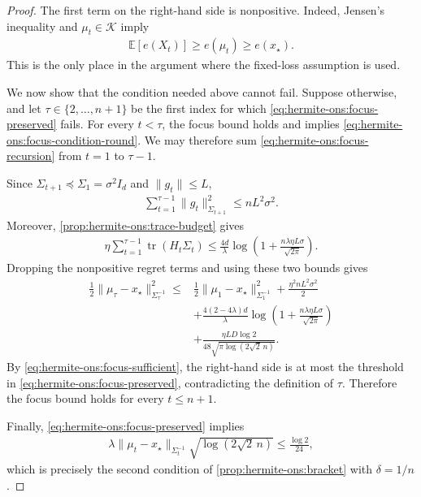 \documentclass{article}
\theoremstyle{plain}
\theoremstyle{definition}
\theoremstyle{plain}
\newcommand{\tr}{\operatorname{tr}}
\newcommand{\E}{\mathbb E}
\newcommand{\cK}{\mathcal K}
\begin{document}
\begin{proof}
    The first term on the right-hand side is nonpositive. Indeed,
    Jensen's inequality and $\mu_t\in\cK$ imply
    \begin{align}
        \E[e(X_t)]
        \geq
        e(\mu_t)
        \geq
        e(x_\star).
        \label{eq:hermite-ons:stationary-nonnegative}
    \end{align}
    This is the only place in the argument where the fixed-loss
    assumption is used.

    We now show that the condition needed above cannot fail. Suppose
    otherwise, and let $\tau\in\{2,\ldots,n+1\}$ be the first index
    for which \eqref{eq:hermite-ons:focus-preserved} fails. For every
    $t<\tau$, the focus bound holds and implies
    \eqref{eq:hermite-ons:focus-condition-round}. We may therefore
    sum \eqref{eq:hermite-ons:focus-recursion} from $t=1$ to
    $\tau-1$.

    Since $\Sigma_{t+1}\preceq\Sigma_1=\sigma^2I_d$ and
    $\|g_t\|\leq L$,
    \begin{align}
        \sum_{t=1}^{\tau-1}
        \|g_t\|_{\Sigma_{t+1}}^2
        \leq nL^2\sigma^2.
        \label{eq:hermite-ons:focus-gradient-budget}
    \end{align}
    Moreover, \cref{prop:hermite-ons:trace-budget} gives
    \begin{align}
        \eta\sum_{t=1}^{\tau-1}\tr(H_t\Sigma_t)
        \leq
        \frac{4d}{\lambda}
        \log\left(
        1+\frac{n\lambda\eta L\sigma}{\sqrt{2\pi}}
        \right).
        \label{eq:hermite-ons:focus-trace-budget}
    \end{align}
    Dropping the nonpositive regret terms and using these two bounds
    gives
    \begin{align}
        \frac12
        \|\mu_\tau-x_\star\|_{\Sigma_\tau^{-1}}^2
        \leq{} &
        \frac12
        \|\mu_1-x_\star\|_{\Sigma_1^{-1}}^2
        +
        \frac{\eta^2nL^2\sigma^2}{2}
        \nonumber  \\
               & +
        \frac{4(2-4\lambda)d}{\lambda}
        \log\left(
        1+\frac{n\lambda\eta L\sigma}{\sqrt{2\pi}}
        \right)
        \nonumber  \\
               & +
        \frac{\eta LD\log2}
        {48\sqrt{\pi\log(2\sqrt2\,n)}}.
    \end{align}
    By \eqref{eq:hermite-ons:focus-sufficient}, the right-hand side
    is at most the threshold in
    \eqref{eq:hermite-ons:focus-preserved}, contradicting the
    definition of $\tau$. Therefore the focus bound holds for every
    $t\leq n+1$.

    Finally, \eqref{eq:hermite-ons:focus-preserved} implies
    \begin{align}
        \lambda
        \|\mu_t-x_\star\|_{\Sigma_t^{-1}}
        \sqrt{\log(2\sqrt2\,n)}
        \leq
        \frac{\log2}{24},
    \end{align}
    which is precisely the second condition of
    \cref{prop:hermite-ons:bracket} with $\delta=1/n$.
\end{proof}
\end{document}

